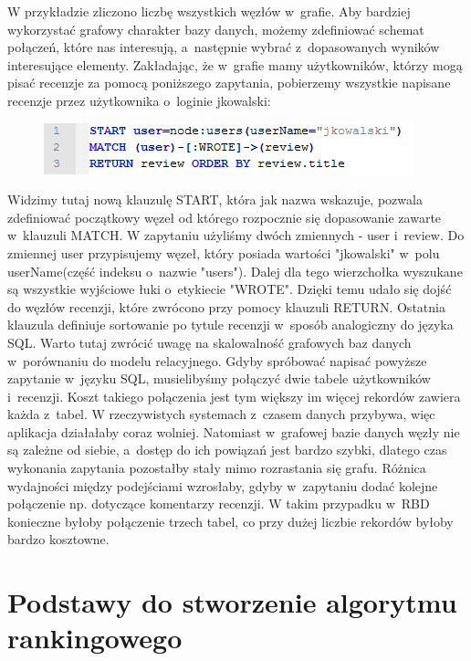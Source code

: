 W przykładzie zliczono liczbę wszystkich węzłów w~grafie. Aby bardziej wykorzystać grafowy charakter bazy danych, możemy zdefiniować schemat połączeń, które nas interesują, a~następnie wybrać z~dopasowanych wyników interesujące elementy. Zakładając, że w~grafie mamy użytkowników, którzy mogą pisać recenzje za pomocą poniższego zapytania, pobierzemy wszystkie napisane recenzje przez użytkownika o~loginie jkowalski:

\begin{figure}[H]
	\centering
	\includegraphics{images/cypher_q2.png}
\end{figure}

Widzimy tutaj nową klauzulę START, która jak nazwa wskazuje, pozwala zdefiniować początkowy węzeł od którego rozpocznie się dopasowanie zawarte w~klauzuli MATCH. W zapytaniu użyliśmy dwóch zmiennych - user i~review. Do zmiennej user przypisujemy węzeł, który posiada wartości "jkowalski" w~polu userName(część indeksu o~nazwie "users"). Dalej dla tego wierzchołka wyszukane są wszystkie wyjściowe łuki o~etykiecie "WROTE". Dzięki temu udało się dojść do węzłów recenzji, które zwrócono przy pomocy klauzuli RETURN. Ostatnia klauzula definiuje sortowanie po tytule recenzji w~sposób analogiczny do języka SQL. Warto tutaj zwrócić uwagę na skalowalność grafowych baz danych w~porównaniu do modelu relacyjnego. Gdyby spróbować napisać powyższe zapytanie w~języku SQL, musielibyśmy połączyć dwie tabele użytkowników i~recenzji. Koszt takiego połączenia jest tym większy im więcej rekordów zawiera każda z~tabel. W rzeczywistych systemach z~czasem danych przybywa, więc aplikacja działałaby coraz wolniej. Natomiast w~grafowej bazie danych węzły nie są zależne od siebie, a~dostęp do ich powiązań jest bardzo szybki, dlatego czas wykonania zapytania pozostałby stały mimo rozrastania się grafu. Różnica wydajności między podejściami wzrosłaby, gdyby w~zapytaniu dodać kolejne połączenie np. dotyczące komentarzy recenzji. W takim przypadku w~RBD konieczne byłoby połączenie trzech tabel, co przy dużej liczbie rekordów byłoby bardzo kosztowne.


\section{Podstawy do stworzenie algorytmu rankingowego}
\label{sec:algTeotia}


